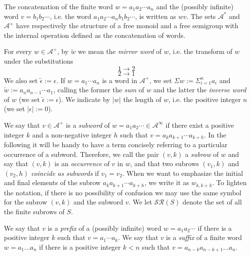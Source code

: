\documentclass[10pt,a4paper]{article}
\begin{document}
The concatenation of the finite word $w=a_1a_2\cdots a_n$ and the (possibly infinite) word $v=b_1b_2\cdots$, i.e. the word $a_1a_2\cdots a_nb_1b_2\cdots$, is written as $wv$. The sets $\mathcal{A}^*$ and $\mathcal{A}^+$ have respectively the structure of a free monoid and a free semigroup with the internal operation defined as the concatenation of words.

For every $w\in\mathcal{A}^{+}$, by $\widetilde{w}$ we mean the \textit{mirror word }of $w$, i.e. the transform of $w$ under the substitutions $$1\rightarrow 2$$ $$2\rightarrow 1$$ 
We also set $\widetilde{\epsilon}:=\epsilon$. If $w=a_1\cdots a_n$ is a word in $\mathcal{A}^+$, we set $\Sigma w:= \Sigma_{i=1}^n a_i$ and $\overleftarrow{w}:=a_na_{n-1}\cdots a_1$, calling the former the \textit{sum} of $w$ and the latter the \textit{inverse word }of $w$ (we set $\overleftarrow{\epsilon}:=\epsilon$). We indicate by $|w|$ the length of $w$, i.e. the positive integer $n$ (we set $|\epsilon|:=0$). 

We say that $v\in\mathcal{A}^+$ is a \textit{subword} of $w=a_1a_2\cdots\in \mathcal{A}^{\infty} $ if there exist a positive integer $k$ and a non-negative integer $h$ such that $v=a_k a_{k+1}\cdots a_{k+h}$. In the following it will be handy to have a term concisely referring to a particular occurrence of a subword. Therefore, we call the pair $(v,k)$  a \textit{subrow} of $w$ and say that $(v,k)$ is an \textit{occurrence} of $v$ in $w$, and that two subrows $(v_1,k)$ and $(v_2,h)$ \textit{coincide as subwords} if $v_1=v_2$. When we want to emphasize the initial and final elements of the subrow $a_ka_{k+1}\cdots a_{k+h}$, we write it as $w_{k,k+h}$. 
To lighten the notation, if there is no possibility of confusion we may use the same symbol for the subrow $(v,k)$ and the subword $v$. We let $\mathcal{SR}(S)$ denote the set of all the finite subrows of $S$.

We say that $v$ is a \textit{prefix} of a (possibly infinite) word $w=a_1a_2\cdots$ if there is a positive integer $k$ such that $v=a_1\cdots a_k$. We say that $v$ is a \textit{suffix} of a finite word $w=a_1\dots a_n$ if there is a positive integer $k< n$ such that $v=a_{n-k}a_{n-k+1}\dots a_n$.

\vspace{0.2cm}
\end{document}

